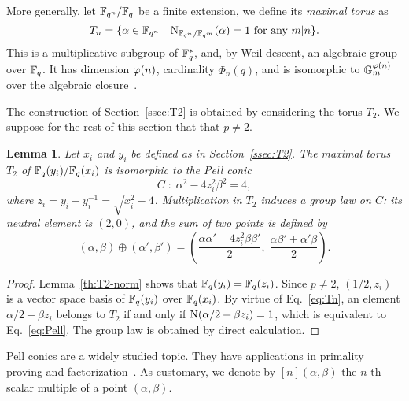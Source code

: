 \documentclass{sig-alternate}
\newtheorem{lemma}[definition]{Lemma}
\begin{document}
More generally, let $\mathbb{F}_{q^n}/\mathbb{F}_q$ be a finite extension, we define
its \emph{maximal torus} as
\begin{equation}
  \label{eq:Tn}
  T_n = \{\alpha\in\mathbb{F}_{q^n} \;|\; \operatorname{N}_{\mathbb{F}_{q^n}/\mathbb{F}_{q^m}}(\alpha) = 1 
  \text{ for any $m|n$} \}.
\end{equation}
This is a multiplicative subgroup of $\mathbb{F}_q^\ast$, and, by Weil
descent, an algebraic group over $\mathbb{F}_q$. It has dimension $\varphi(n)$,
cardinality $\Phi_n(q)$, and is isomorphic to
$\mathbb{G}_m^{\varphi(n)}$ over the algebraic
closure~\cite{rubin-silverberg+crypto03,rubin+silverberg03,voskresenskii98}.

The construction of Section~\ref{ssec:T2} is obtained by considering
the torus $T_2$. We suppose for the rest of this section that that
$p\ne2$.

\begin{lemma}
  Let $x_i$ and $y_i$ be defined as in Section~\ref{ssec:T2}. The
  maximal torus $T_2$ of $\mathbb{F}_q(y_i)/\mathbb{F}_q(x_i)$ is isomorphic to the
  \emph{Pell conic}
  \begin{equation}
    \label{eq:Pell}
    C \;:\; \alpha^2 - 4z_i^2\beta^2 = 4,
  \end{equation}
  where $z_i = y_i - y_i^{-1}=\sqrt{x_i^2-4}$. Multiplication in $T_2$
  induces a group law on $C$: its neutral element is $(2,0)$, and the
  sum of two points is defined by
  \begin{equation}
    \label{eq:Pell-add}
    (\alpha,\beta)\oplus(\alpha',\beta') =
    \left(\frac{\alpha\alpha' + 4z_i^2\beta\beta'}{2},\; \frac{\alpha\beta' + \alpha'\beta}{2}\right).
  \end{equation}
\end{lemma}
\begin{proof}
  Lemma~\ref{th:T2-norm} shows that $\mathbb{F}_q(y_i)=\mathbb{F}_q(z_i)$. Since
  $p\ne2$, $(1/2, z_i)$ is a vector space basis of $\mathbb{F}_q(y_i)$ over
  $\mathbb{F}_q(x_i)$.  By virtue of Eq.~\eqref{eq:Tn}, an element
  $\alpha/2+\beta z_i$ belongs to $T_2$ if and only if
  $\operatorname{N}(\alpha/2+\beta z_i)=1$, which is equivalent to
  Eq.~\eqref{eq:Pell}.  The group law is obtained by direct
  calculation.
\end{proof}

Pell conics are a widely studied topic. They have applications in
primality proving and
factorization~\cite{lemmermeyer03,hambleton12}. As customary, we
denote by $[n](\alpha,\beta)$ the $n$-th scalar multiple of a point
$(\alpha,\beta)$.
\end{document}
